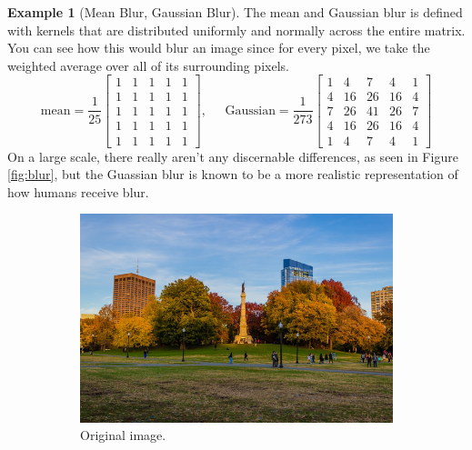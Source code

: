 \documentclass{article}
\theoremstyle{definition}
\newtheorem{example}{Example}[section]
\theoremstyle{remark}
\theoremstyle{definition}
\begin{document}
\begin{example}[Mean Blur, Gaussian Blur]
The mean and Gaussian blur is defined with kernels that are distributed uniformly and normally across the entire matrix. You can see how this would blur an image since for every pixel, we take the weighted average over all of its surrounding pixels. 
\[\text{mean} = \frac{1}{25} \begin{bmatrix} 1 & 1 & 1 & 1 & 1 \\ 1 & 1 & 1 & 1 & 1 \\ 1 & 1 & 1 & 1 & 1 \\ 1 & 1 & 1 & 1 & 1 \\ 1 & 1 & 1 & 1 & 1 \end{bmatrix}, \;\;\;\;\; \text{Gaussian} = \frac{1}{273} \begin{bmatrix} 1 & 4 & 7 & 4 & 1 \\ 4 & 16 & 26 & 16 & 4 \\ 7 & 26 & 41 & 26 & 7 \\ 4 & 16 & 26 & 16 & 4 \\ 1 & 4 & 7 & 4 & 1 \end{bmatrix}\]
On a large scale, there really aren't any discernable differences, as seen in Figure \ref{fig:blur}, but the Guassian blur is known to be a more realistic representation of how humans receive blur. 
\begin{figure}[hbt!]
    \centering
    \begin{subfigure}[b]{0.32\textwidth}
    \centering
        \includegraphics[width=\textwidth]{Images/OpenCV/Park_Full.png}
        \caption{Original image. }
        \label{fig:d}
    \end{subfigure}
    \begin{subfigure}[b]{0.32\textwidth}

\end{subfigure}
\end{figure}
\end{example}
\end{document}
